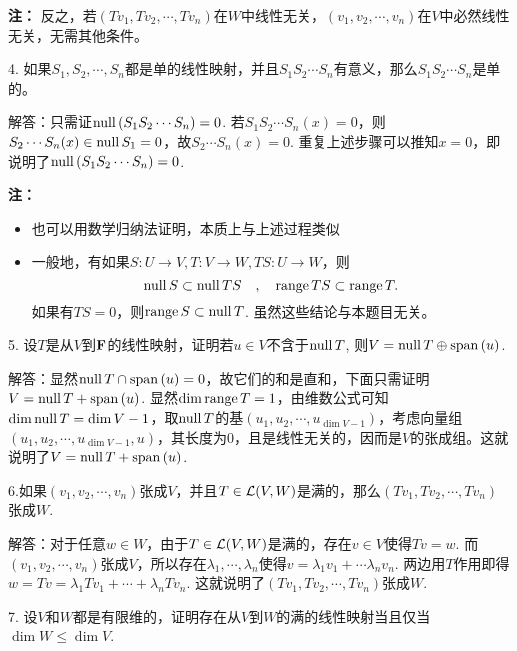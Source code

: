 \documentclass[hyperref,]{ctexart}
\providecommand{\tightlist}{%
  \setlength{\itemsep}{0pt}\setlength{\parskip}{0pt}}
\begin{document}
\noindent{} \textbf{注：}
反之，若\((Tv_1,Tv_2,\cdots,Tv_n)\)在\(W\)中线性无关，\((v_1,v_2,\cdots,v_n)\)在\(V\)中必然线性无关，无需其他条件。

\bigskip

\noindent{} 4.
如果\(S_1,S_2,\cdots,S_n\)都是单的线性映射，并且\(S_1S_2\cdots S_n\)有意义，那么\(S_1S_2\cdots S_n\)是单的。

\noindent{} 解答：只需证\(\mathrm{null}\, (S_1S_2\cdots S_n)={0}\).
若\(S_1S_2\cdots S_n(x) =0\)，则\(S_2\cdots S_n(x)\in \mathrm{null}\, S_1={0}\)，故\(S_2\cdots S_n(x)=0\).
重复上述步骤可以推知\(x=0\)，即说明了\(\mathrm{null}\, (S_1S_2\cdots S_n)={0}\).

\noindent{} \textbf{注：}

\begin{itemize}
\tightlist
\item
  也可以用数学归纳法证明，本质上与上述过程类似
\item
  一般地，有如果\(S:U\rightarrow V, T:V\rightarrow W,TS:U\rightarrow W\)，则
  \[\mathrm{null}\, S\subset \mathrm{null}\, TS\quad,\quad \mathrm{range}\, TS\subset \mathrm{range}\, T.\]
  如果有\(TS=0\)，则\(\mathrm{range}\, S\subset \mathrm{null}\, T\).
  虽然这些结论与本题目无关。
\end{itemize}

\bigskip

\noindent{} 5.
设\(T\)是从\(V\)到\(\mathbf{F}\)的线性映射，证明若\(u\in V\)不含于\(\mathrm{null}\, T\),
则\(V= \mathrm{null}\, T\oplus \mathrm{span}\,(u)\).

\noindent{}
解答：显然\(\mathrm{null}\, T\cap \mathrm{span}\,(u)={0}\)，故它们的和是直和，下面只需证明\(V= \mathrm{null}\, T+ \mathrm{span}\,(u)\).
显然\(\mathrm{dim}\, \mathrm{range}\, T=1\)，由维数公式可知\(\mathrm{dim}\, \mathrm{null}\, T = \mathrm{dim}\, V-1\)，取\(\mathrm{null}\, T\)的基\((u_1,u_2,\cdots,u_{\dim V-1})\)，考虑向量组\((u_1,u_2,\cdots,u_{\dim V-1},u)\)，其长度为\(0\)，且是线性无关的，因而是\(V\)的张成组。这就说明了\(V= \mathrm{null}\, T+ \mathrm{span}\,(u)\).

\bigskip

\noindent{}
6.如果\((v_1,v_2,\cdots,v_n)\)张成\(V\)，并且\(T\in \mathcal{L}(V,W)\)是满的，那么\((Tv_1,Tv_2,\cdots,Tv_n)\)张成\(W\).

\noindent{}
解答：对于任意\(w\in W\)，由于\(T\in \mathcal{L}(V,W)\)是满的，存在\(v\in V\)使得\(Tv=w\).
而\((v_1,v_2,\cdots,v_n)\)张成\(V\)，所以存在\(\lambda_1,\cdots,\lambda_n\)使得\(v = \lambda_1v_1+\cdots \lambda_nv_n\).
两边用\(T\)作用即得\(w = Tv = \lambda_1 Tv_1+\cdots+\lambda_n Tv_n\).
这就说明了\((Tv_1,Tv_2,\cdots,Tv_n)\)张成\(W\).

\bigskip

\noindent{} 7.
设\(V\)和\(W\)都是有限维的，证明存在从\(V\)到\(W\)的满的线性映射当且仅当\(\dim W\le \dim V\).
\end{document}
